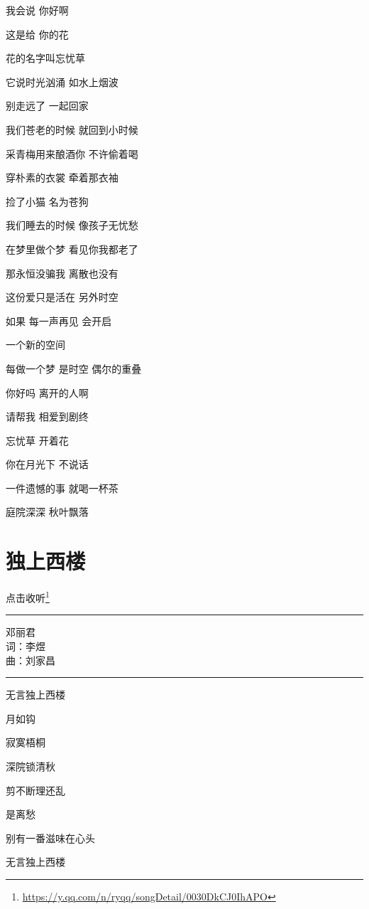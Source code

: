 \documentclass[]{ctexbook}
\renewcommand{\href}[2]{#2\footnote{\url{#1}}}
\begin{document}
我会说 你好啊

这是给 你的花

花的名字叫忘忧草

它说时光汹涌 如水上烟波

别走远了 一起回家

我们苍老的时候 就回到小时候

采青梅用来酿酒你 不许偷着喝

穿朴素的衣裳 牵着那衣袖

捡了小猫 名为苍狗

我们睡去的时候 像孩子无忧愁

在梦里做个梦 看见你我都老了

那永恒没骗我 离散也没有

这份爱只是活在 另外时空

如果 每一声再见 会开启

一个新的空间

每做一个梦 是时空 偶尔的重叠

你好吗 离开的人啊

请帮我 相爱到剧终

忘忧草 开着花

你在月光下 不说话

一件遗憾的事 就喝一杯茶

庭院深深 秋叶飘落

\section*{独上西楼}\label{one-in-the-building}


\href{https://y.qq.com/n/ryqq/songDetail/0030DkCJ0IhAPO}{点击收听}

\begin{center}\rule{0.5\linewidth}{0.5pt}\end{center}

邓丽君\\
词：李煜\\
曲：刘家昌

\begin{center}\rule{0.5\linewidth}{0.5pt}\end{center}

无言独上西楼

月如钩

寂寞梧桐

深院锁清秋

剪不断理还乱

是离愁

别有一番滋味在心头

无言独上西楼
\end{document}
